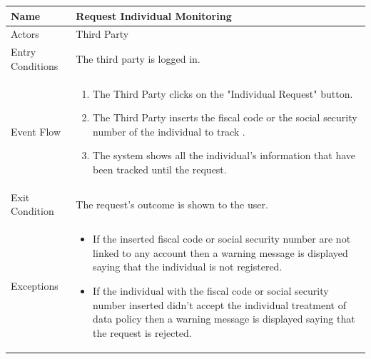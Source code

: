 \begin{enumerate}
\FloatBarrier
\begin{table}[h]
\begin{tabular}{|l|p{}|}
\hline
Name             & Request Individual Monitoring \\ \hline
Actors           & Third Party  \\ \hline
Entry Conditions & The third party is logged in.    \\ \hline
Event Flow       & \begin{enumerate}
            \item The Third Party clicks on the "Individual Request" button.
            \item The Third Party inserts the fiscal code or the social security number of the individual to track .
            \item The system shows all the individual's information that have been tracked until the request. 
        \end{enumerate}\\ \hline
Exit Condition   & The request's outcome is shown to the user.\\ \hline
Exceptions       & \begin{itemize}
\item If the inserted fiscal code or social security number are not linked to any account then a warning message is displayed saying that the individual is not registered.
\item If the individual with the fiscal code or social security number inserted didn't accept the individual treatment of data policy then a warning message is displayed saying that the request is rejected.
\end{itemize}\\ \hline
\end{tabular}
\end{table}
\FloatBarrier


\end{enumerate}

